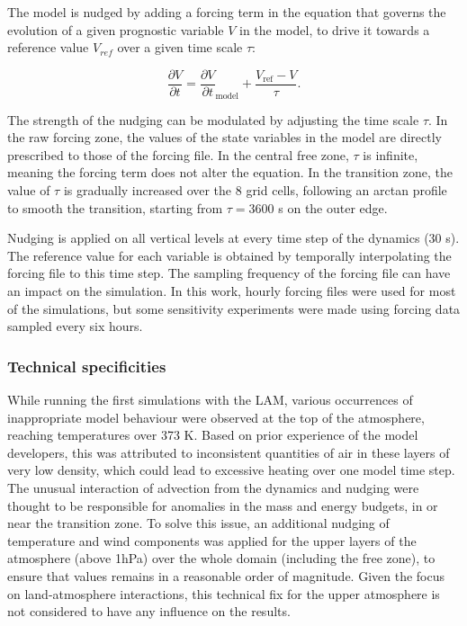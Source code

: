 The model is nudged by adding a forcing term in the equation that governs the evolution of a given prognostic variable $V$ in the model, to drive it towards a reference value $V_{ref}$ over a given time scale $\tau$:

\begin{equation}
    \frac{\partial V}{\partial t} = \frac{\partial V}{\partial t}_{\text{model}}+ \frac{V_{\text{ref}} - V}{\tau}.
\end{equation}

The strength of the nudging can be modulated by adjusting the time scale $\tau$.
In the raw forcing zone, the values of the state variables in the model are directly prescribed to those of the forcing file. 
In the central free zone, $\tau$ is infinite, meaning the forcing term does not alter the equation. 
In the transition zone, the value of $\tau$ is gradually increased over the 8 grid cells, following an arctan profile to smooth the transition, starting from $\tau = 3600$ s on the outer edge.

Nudging is applied on all vertical levels at every time step of the dynamics (30 s). The reference value for each variable is obtained by temporally interpolating the forcing file to this time step. The sampling frequency of the forcing file can have an impact on the simulation. In this work, hourly forcing files were used for most of the simulations, but some sensitivity experiments were made using forcing data sampled every six hours.

\subsubsection{Technical specificities}

While running the first simulations with the LAM, various occurrences of inappropriate model behaviour were observed at the top of the atmosphere, reaching temperatures over 373 K. Based on prior experience of the model developers, this was attributed to inconsistent quantities of air in these layers of very low density, which could lead to excessive heating over one model time step. The unusual interaction of advection from the dynamics and nudging were thought to be responsible for anomalies in the mass and energy budgets, in or near the transition zone.
To solve this issue, an additional nudging of temperature and wind components was applied for the upper layers of the atmosphere (above 1hPa) over the whole domain (including the free zone), to ensure that values remains in a reasonable order of magnitude. Given the focus on land-atmosphere interactions, this technical fix for the upper atmosphere is not considered to have any influence on the results.

